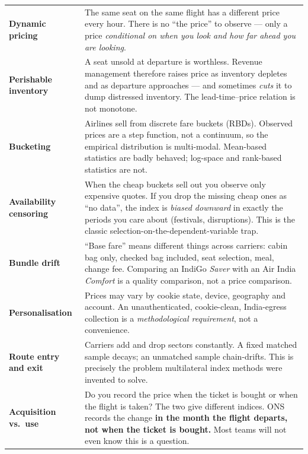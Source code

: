 \begin{center}
\small
\begin{tabularx}{\textwidth}{@{}L{4.3cm} X@{}}
\toprule
{} &  \\
\midrule
\textbf{Dynamic pricing} & The same seat on the same flight has a different price every
hour. There is no ``the price'' to observe --- only a price \emph{conditional on when you
look and how far ahead you are looking}. \\
\addlinespace[2pt]
\textbf{Perishable inventory} & A seat unsold at departure is worthless. Revenue management
therefore raises price as inventory depletes and as departure approaches --- and sometimes
\emph{cuts} it to dump distressed inventory. The lead-time--price relation is not monotone. \\
\addlinespace[2pt]
\textbf{Bucketing} & Airlines sell from discrete fare buckets (RBDs). Observed prices are a
step function, not a continuum, so the empirical distribution is multi-modal. Mean-based
statistics are badly behaved; log-space and rank-based statistics are not. \\
\addlinespace[2pt]
\textbf{Availability censoring} & When the cheap buckets sell out you observe only
expensive quotes. If you drop the missing cheap ones as ``no data'', the index is
\emph{biased downward} in exactly the periods you care about (festivals, disruptions). This
is the classic selection-on-the-dependent-variable trap. \\
\addlinespace[2pt]
\textbf{Bundle drift} & ``Base fare'' means different things across carriers: cabin bag
only, checked bag included, seat selection, meal, change fee. Comparing an IndiGo
\emph{Saver} with an Air India \emph{Comfort} is a quality comparison, not a price
comparison. \\
\addlinespace[2pt]
\textbf{Personalisation} & Prices may vary by cookie state, device, geography and account.
An unauthenticated, cookie-clean, India-egress collection is a \emph{methodological
requirement}, not a convenience. \\
\addlinespace[2pt]
\textbf{Route entry and exit} & Carriers add and drop sectors constantly. A fixed matched
sample decays; an unmatched sample chain-drifts. This is precisely the problem multilateral
index methods were invented to solve. \\
\addlinespace[2pt]
\textbf{Acquisition vs.\ use} & Do you record the price when the ticket is bought or when
the flight is taken? The two give different indices. ONS records the change \textbf{in the
month the flight departs, not when the ticket is bought.} Most teams will not even know
this is a question. \\
\bottomrule
\end{tabularx}
\end{center}

